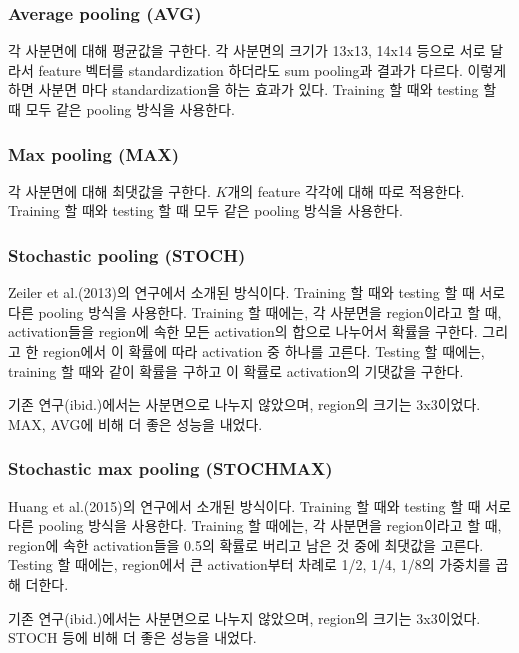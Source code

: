 \documentclass[a4paper,9pt]{article}
\begin{document}
\begin{multicols}{2}
\subsubsection{Average pooling (AVG)}

각 사분면에 대해 평균값을 구한다.
각 사분면의 크기가 13x13, 14x14 등으로 서로 달라서 feature 벡터를 standardization 하더라도 sum pooling과 결과가 다르다.
이렇게 하면 사분면 마다 standardization을 하는 효과가 있다.
Training 할 때와 testing 할 때 모두 같은 pooling 방식을 사용한다.

\subsubsection{Max pooling (MAX)}

각 사분면에 대해 최댓값을 구한다.
$K$개의 feature 각각에 대해 따로 적용한다.
Training 할 때와 testing 할 때 모두 같은 pooling 방식을 사용한다.

\subsubsection{Stochastic pooling (STOCH)}

Zeiler et al.(2013)의 연구에서 소개된 방식이다.
Training 할 때와 testing 할 때 서로 다른 pooling 방식을 사용한다.
Training 할 때에는, 각 사분면을 region이라고 할 때, activation들을 region에 속한 모든 activation의 합으로 나누어서 확률을 구한다.
그리고 한 region에서 이 확률에 따라 activation 중 하나를 고른다.
Testing 할 때에는, training 할 때와 같이 확률을 구하고 이 확률로 activation의 기댓값을 구한다.

기존 연구(ibid.)에서는 사분면으로 나누지 않았으며, region의 크기는 3x3이었다. MAX, AVG에 비해 더 좋은 성능을 내었다.

\subsubsection{Stochastic max pooling (STOCHMAX)}

Huang et al.(2015)의 연구에서 소개된 방식이다.
Training 할 때와 testing 할 때 서로 다른 pooling 방식을 사용한다.
Training 할 때에는, 각 사분면을 region이라고 할 때, region에 속한 activation들을 0.5의 확률로 버리고 남은 것 중에 최댓값을 고른다.
Testing 할 때에는, region에서 큰 activation부터 차례로 1/2, 1/4, 1/8의 가중치를 곱해 더한다.

기존 연구(ibid.)에서는 사분면으로 나누지 않았으며, region의 크기는 3x3이었다. STOCH 등에 비해 더 좋은 성능을 내었다.


\end{multicols}
\end{document}
